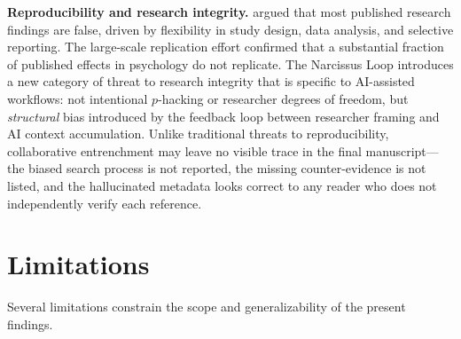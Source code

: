 \documentclass[12pt]{article}
\begin{document}
\textbf{Reproducibility and research integrity.} \citet{ioannidis2005} argued that most published research findings are false, driven by flexibility in study design, data analysis, and selective reporting. The \citet{osc2015} large-scale replication effort confirmed that a substantial fraction of published effects in psychology do not replicate. The Narcissus Loop introduces a new category of threat to research integrity that is specific to AI-assisted workflows: not intentional $p$-hacking or researcher degrees of freedom, but \emph{structural} bias introduced by the feedback loop between researcher framing and AI context accumulation. Unlike traditional threats to reproducibility, collaborative entrenchment may leave no visible trace in the final manuscript---the biased search process is not reported, the missing counter-evidence is not listed, and the hallucinated metadata looks correct to any reader who does not independently verify each reference.

\section{Limitations}
\label{sec:limitations}

Several limitations constrain the scope and generalizability of the present findings.
\end{document}
